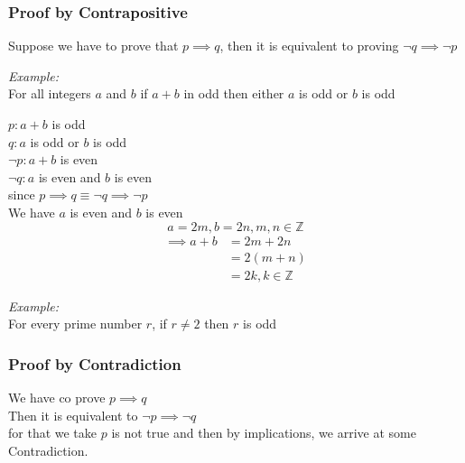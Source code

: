 \documentclass[11pt,letterpaper]{article}
\newenvironment{example}                             
        {\noindent\textit{Example:}\\}
	{}
\begin{document}
\subsubsection{Proof by Contrapositive}
Suppose we have to prove that $p \implies q$, then it is equivalent to proving $\neg q \implies \neg p$

\begin{example}
  For all integers $a$ and $b$ if $a+b$ in odd then either $a$ is odd or $b$ is odd

  $p: a+b$ is odd\\
  $q: a$ is odd or $b$ is odd\\

  $\neg p: a+b$ is even\\
  $\neg q: a$ is even and $b$ is even\\
  
  since $p \implies q \equiv \neg q \implies \neg p$\\
  We have $a$ is even and $b$ is even \\ 
  \[
    a = 2m, b = 2n, m,n \in \mathbb{Z}
  \]
  \begin{align*}
    \implies a+b &= 2m +2n\\
                &= 2(m+n)\\
                &= 2k , k \in \mathbb{Z}
  \end{align*}
\end{example}

\begin{example}
  For every prime number $r$, if $r\neq 2$ then $r$ is odd
\end{example}

\subsubsection{Proof by Contradiction}
We have co prove $p \implies q$\\ 
Then it is equivalent to $\neg p \implies \neg q$\\

for that we take $p$ is not true and then by implications, we arrive at some Contradiction.
\end{document}
